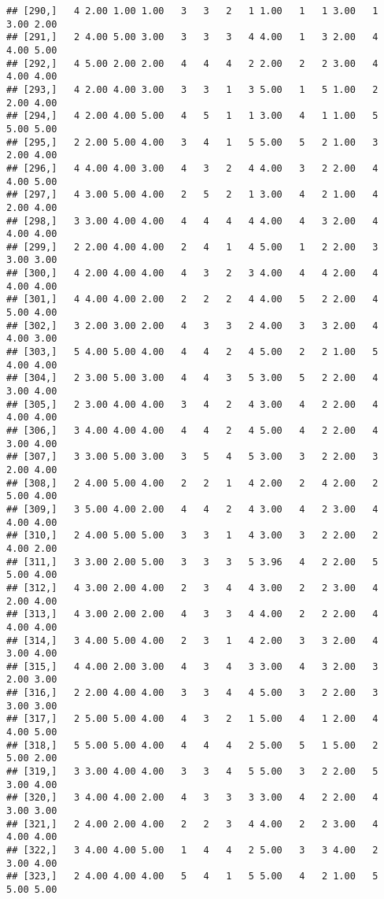 \documentclass[]{article}
\begin{document}
\begin{verbatim}
## [290,]   4 2.00 1.00 1.00   3   3   2   1 1.00   1   1 3.00   1 3.00 2.00
## [291,]   2 4.00 5.00 3.00   3   3   3   4 4.00   1   3 2.00   4 4.00 5.00
## [292,]   4 5.00 2.00 2.00   4   4   4   2 2.00   2   2 3.00   4 4.00 4.00
## [293,]   4 2.00 4.00 3.00   3   3   1   3 5.00   1   5 1.00   2 2.00 4.00
## [294,]   4 2.00 4.00 5.00   4   5   1   1 3.00   4   1 1.00   5 5.00 5.00
## [295,]   2 2.00 5.00 4.00   3   4   1   5 5.00   5   2 1.00   3 2.00 4.00
## [296,]   4 4.00 4.00 3.00   4   3   2   4 4.00   3   2 2.00   4 4.00 5.00
## [297,]   4 3.00 5.00 4.00   2   5   2   1 3.00   4   2 1.00   4 2.00 4.00
## [298,]   3 3.00 4.00 4.00   4   4   4   4 4.00   4   3 2.00   4 4.00 4.00
## [299,]   2 2.00 4.00 4.00   2   4   1   4 5.00   1   2 2.00   3 3.00 3.00
## [300,]   4 2.00 4.00 4.00   4   3   2   3 4.00   4   4 2.00   4 4.00 4.00
## [301,]   4 4.00 4.00 2.00   2   2   2   4 4.00   5   2 2.00   4 5.00 4.00
## [302,]   3 2.00 3.00 2.00   4   3   3   2 4.00   3   3 2.00   4 4.00 3.00
## [303,]   5 4.00 5.00 4.00   4   4   2   4 5.00   2   2 1.00   5 4.00 4.00
## [304,]   2 3.00 5.00 3.00   4   4   3   5 3.00   5   2 2.00   4 3.00 4.00
## [305,]   2 3.00 4.00 4.00   3   4   2   4 3.00   4   2 2.00   4 4.00 4.00
## [306,]   3 4.00 4.00 4.00   4   4   2   4 5.00   4   2 2.00   4 3.00 4.00
## [307,]   3 3.00 5.00 3.00   3   5   4   5 3.00   3   2 2.00   3 2.00 4.00
## [308,]   2 4.00 5.00 4.00   2   2   1   4 2.00   2   4 2.00   2 5.00 4.00
## [309,]   3 5.00 4.00 2.00   4   4   2   4 3.00   4   2 3.00   4 4.00 4.00
## [310,]   2 4.00 5.00 5.00   3   3   1   4 3.00   3   2 2.00   2 4.00 2.00
## [311,]   3 3.00 2.00 5.00   3   3   3   5 3.96   4   2 2.00   5 5.00 4.00
## [312,]   4 3.00 2.00 4.00   2   3   4   4 3.00   2   2 3.00   4 2.00 4.00
## [313,]   4 3.00 2.00 2.00   4   3   3   4 4.00   2   2 2.00   4 4.00 4.00
## [314,]   3 4.00 5.00 4.00   2   3   1   4 2.00   3   3 2.00   4 3.00 4.00
## [315,]   4 4.00 2.00 3.00   4   3   4   3 3.00   4   3 2.00   3 2.00 3.00
## [316,]   2 2.00 4.00 4.00   3   3   4   4 5.00   3   2 2.00   3 3.00 3.00
## [317,]   2 5.00 5.00 4.00   4   3   2   1 5.00   4   1 2.00   4 4.00 5.00
## [318,]   5 5.00 5.00 4.00   4   4   4   2 5.00   5   1 5.00   2 5.00 2.00
## [319,]   3 3.00 4.00 4.00   3   3   4   5 5.00   3   2 2.00   5 3.00 4.00
## [320,]   3 4.00 4.00 2.00   4   3   3   3 3.00   4   2 2.00   4 3.00 3.00
## [321,]   2 4.00 2.00 4.00   2   2   3   4 4.00   2   2 3.00   4 4.00 4.00
## [322,]   3 4.00 4.00 5.00   1   4   4   2 5.00   3   3 4.00   2 3.00 4.00
## [323,]   2 4.00 4.00 4.00   5   4   1   5 5.00   4   2 1.00   5 5.00 5.00

\end{verbatim}
\end{document}
